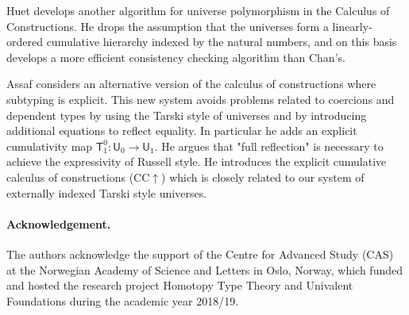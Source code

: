 \documentclass[11pt,a4paper]{article}
\def\UU{\mathsf{U}}
\newcommand{\T}{\mathsf{T}}
\begin{document}
Huet \cite{Huet87} develops another algorithm for universe polymorphism in the Calculus of Constructions. He drops the assumption that the universes form a linearly-ordered cumulative hierarchy indexed by the natural numbers, and on this basis develops a more efficient consistency checking algorithm than Chan's.

Assaf \cite{Assaf14} considers an alternative version of the calculus of
constructions where subtyping is explicit. This new system avoids problems related to coercions and dependent types by using the Tarski style
of universes and by introducing additional equations to reflect equality. In particular he adds an explicit cumulativity map $\T^0_1 : \UU_0 \to \UU_1$. He argues that "full reflection" is necessary to achieve the expressivity of Russell style. He introduces the explicit cumulative calculus of constructions (CC$\uparrow$) which is closely related to our system of externally indexed Tarski style universes.

\paragraph{Acknowledgement.}
The authors acknowledge the support of the Centre for Advanced Study (CAS)
at the Norwegian Academy of Science and Letters
in Oslo, Norway, which funded and hosted the research project Homotopy  
Type Theory and Univalent Foundations during the academic year 2018/19.


\end{document}
